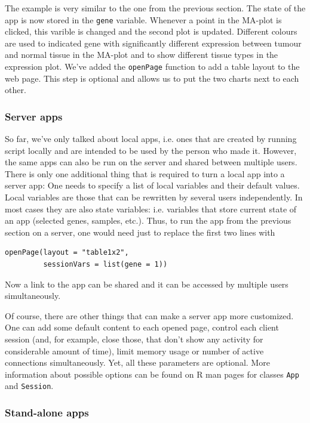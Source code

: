 \documentclass[twocolumn,10pt]{article}
\begin{document}
The example is very similar to the one from the previous section. The state of the app is now stored in the \texttt{gene} variable. Whenever a point in the MA-plot is clicked, this varible is changed and the second plot is updated. Different colours are used to indicated gene with significantly different expression between tumour and normal tissue in the MA-plot and to show different tissue types in the expression plot. We've added the \texttt{openPage} function to add a table layout to the web page. This step is optional and allows us to put the two charts next to each other.

\subsubsection{Server apps}

So far, we've only talked about local apps, i.e. ones that are created by running script locally and are intended to be used by the person who made it. However, the same apps can also be run on the server and shared between multiple users. There is only one additional thing that is required to turn a local app into a server app: One needs to specify a list of local variables and their default values. Local variables are those that can be rewritten by several users independently. In most cases they are also state variables: i.e. variables that store current state of an app (selected genes, samples, etc.). Thus, to run the app from the previous section on a server, one would need just to replace the first two lines with

\begin{verbatim}
openPage(layout = "table1x2", 
         sessionVars = list(gene = 1))
\end{verbatim}

Now a link to the app  can be shared and it can be accessed by multiple users simultaneously.

Of course, there are other things that can make a server app more customized. One can add some default content to each opened page, control each client session (and, for example, close those, that don't show any activity for considerable amount of time), limit memory usage or number of active connections simultaneously. Yet, all these parameters are optional. More information about possible options can be found on R man pages for classes \texttt{App} and \texttt{Session}.

\subsubsection{Stand-alone apps}
\end{document}

